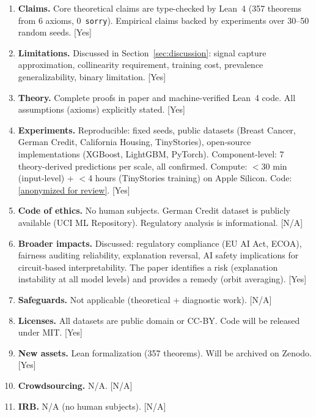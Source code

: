 \documentclass{article}
\begin{document}
\begin{enumerate}
\item \textbf{Claims.} Core theoretical claims are type-checked by Lean~4 (357 theorems from 6 axioms, 0~\texttt{sorry}). Empirical claims backed by experiments over 30--50 random seeds. [Yes]

\item \textbf{Limitations.} Discussed in Section~\ref{sec:discussion}: signal capture approximation, collinearity requirement, training cost, prevalence generalizability, binary limitation. [Yes]

\item \textbf{Theory.} Complete proofs in paper and machine-verified Lean~4 code. All assumptions (axioms) explicitly stated. [Yes]

\item \textbf{Experiments.} Reproducible: fixed seeds, public datasets (Breast Cancer, German Credit, California Housing, TinyStories), open-source implementations (XGBoost, LightGBM, PyTorch). Component-level: 7 theory-derived predictions per scale, all confirmed. Compute: $<$30 min (input-level) + $<$4 hours (TinyStories training) on Apple Silicon. Code: \url{[anonymized for review]}. [Yes]

\item \textbf{Code of ethics.} No human subjects. German Credit dataset is publicly available (UCI ML Repository). Regulatory analysis is informational. [N/A]

\item \textbf{Broader impacts.} Discussed: regulatory compliance (EU AI Act, ECOA), fairness auditing reliability, explanation reversal, AI safety implications for circuit-based interpretability. The paper identifies a risk (explanation instability at all model levels) and provides a remedy (orbit averaging). [Yes]

\item \textbf{Safeguards.} Not applicable (theoretical + diagnostic work). [N/A]
\item \textbf{Licenses.} All datasets are public domain or CC-BY. Code will be released under MIT. [Yes]
\item \textbf{New assets.} Lean formalization (357 theorems). Will be archived on Zenodo. [Yes]
\item \textbf{Crowdsourcing.} N/A. [N/A]
\item \textbf{IRB.} N/A (no human subjects). [N/A]
\end{enumerate}
\end{document}

